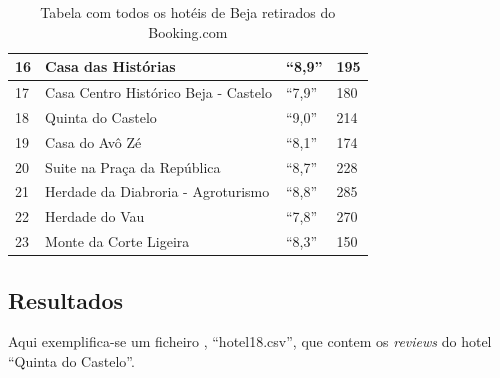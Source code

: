 \documentclass[a4paper,10pt]{article}
\begin{document}
\begin{table}[!ht]
\begin{tabular}{|l|l|l|l|}
    16 & Casa das Histórias                                 & ``8,9''       & 195   \\ \hline
    17 & Casa Centro Histórico Beja - Castelo               & ``7,9''       & 180   \\ \hline
    18 & Quinta do Castelo                                  & ``9,0''       & 214   \\ \hline
    19 & Casa do Avô Zé                                     & ``8,1''       & 174   \\ \hline
    20 & Suite na Praça da República                        & ``8,7''       & 228   \\ \hline
    21 & Herdade da Diabroria - Agroturismo                 & ``8,8''       & 285   \\ \hline
    22 & Herdade do Vau                                     & ``7,8''       & 270   \\ \hline
    23 & Monte da Corte Ligeira                             & ``8,3''       & 150   \\ \hline
  \end{tabular}
  \caption{Tabela com todos os hotéis de Beja retirados do Booking.com}
\end{table}

\subsection{Resultados}

Aqui exemplifica-se um ficheiro , ``hotel18.csv'', que contem os \textit{reviews} do hotel ``Quinta do Castelo''.
\end{document}
